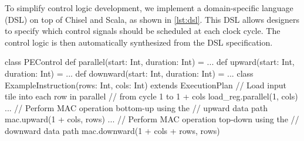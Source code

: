 To simplify control logic development, we implement a domain-specific 
language (DSL) on top of Chisel and Scala, as shown in \autoref{lst:dsl}. 
This DSL allows designers to specify which control signals should be 
scheduled at each clock cycle. The control logic is then automatically 
synthesized from the DSL specification.

\begin{listing}
\begin{mintedscala}
class PEControl {
  def parallel(start: Int, duration: Int) = ...
  def upward(start: Int, duration: Int) = ...
  def downward(start: Int, duration: Int) = ...
}
class ExampleInstruction(rows: Int, cols: Int)
  extends ExecutionPlan {
  // Load input tile into each row in parallel
  // from cycle 1 to 1 + cols
  load_reg.parallel(1, cols)
  ...
  // Perform MAC operation bottom-up using the
  // upward data path
  mac.upward(1 + cols, rows)
  ...
  // Perform MAC operation top-down using the
  // downward data path
  mac.downward(1 + cols + rows, rows)
}
\end{mintedscala}
\caption{\MSAGA{} Controller DSL.}
\label{lst:dsl}
\end{listing}
